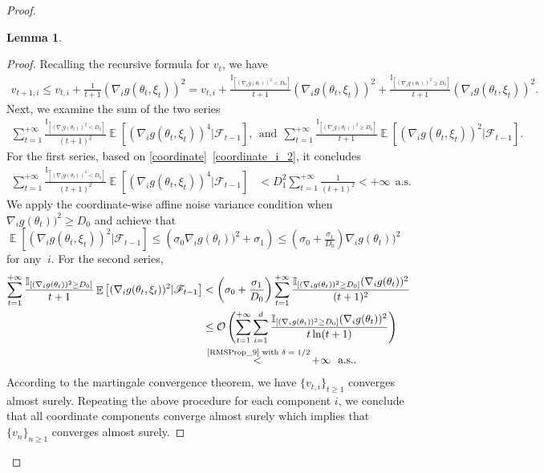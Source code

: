 \documentclass[standalone]{article}
\newcommand{\I}{\mathbb{I}}
\newtheorem{lem}{Lemma}[section]
\DeclareMathOperator{\Expect}{\mathbb{E}}
\begin{document}
\begin{proof}
\begin{lem}
\end{lem}
\begin{proof}
Recalling the recursive formula for \(v_t\), we have
\begin{align*}
   v_{t+1,i}\le v_{t,i}+\frac{1}{t+1}(\nabla_{i}g(\theta_{t},\xi_{t}))^{2} = v_{t,i}+\frac{\I_{[(\nabla_{i}g(\theta_{t}))^{2}<D_{0}]}}{t+1}(\nabla_{i}g(\theta_{t},\xi_{t}))^{2} +\frac{\I_{[(\nabla_{i}g(\theta_{t}))^{2}\ge D_{0}]}}{t+1}(\nabla_{i}g(\theta_{t},\xi_{t}))^{2}.
\end{align*}
Next, we examine the sum of the two series
\begin{align*}
 \sum_{t=1}^{+\infty}  \frac{\I_{[(\nabla_{i}g(\theta_{t}))^{2}<D_{0}]}}{(t+1)^{2}}\Expect\left[(\nabla_{i}g(\theta_{t},\xi_{t}))^{4} |\mathscr{F}_{t-1}\right],\ \ \text{and}\ \  \sum_{t=1}^{+\infty}  \frac{\I_{[(\nabla_{i}g(\theta_{t}))^{2}\ge D_{0}]}}{t+1}\Expect\left[(\nabla_{i}g(\theta_{t},\xi_{t}))^{2}|\mathscr{F}_{t-1}\right] .
\end{align*}
For the first series, based on \cref{coordinate}~\ref{coordinate_i_2}, it concludes
\begin{align*}
 \sum_{t=1}^{+\infty}  \frac{\I_{[(\nabla_{i}g(\theta_{t}))^{2}<D_{0}]}}{(t+1)^{2}}\Expect\left[(\nabla_{i}g(\theta_{t},\xi_{t}))^{4} |\mathscr{F}_{t-1}\right]&<D_{1}^{2}  \sum_{t=1}^{+\infty}  \frac{1}{(t+1)^{2}}<+\infty\ \ \text{a.s.}
\end{align*}
We apply the coordinate-wise affine noise variance condition when $\nabla_{i}g(\theta_{t}))^{2}\ge D_{0}$  and achieve that $\Expect\left[(\nabla_{i}g(\theta_{t},\xi_{t}))^{2} |\mathscr{F}_{t-1}\right] \leq \left(\sigma_0 \nabla_{i}g(\theta_{t}))^{2}  + \sigma_1 \right) \leq (\sigma_{0}+\frac{\sigma_{1}}{D_{0}})\nabla_{i}g(\theta_{t}))^{2}$ for any $\ i$. For the second series, 
\begin{align*}
 \sum_{t=1}^{+\infty}  \frac{\I_{[(\nabla_{i}g(\theta_{t}))^{2}\ge D_{0}]}}{t+1}\Expect\left[(\nabla_{i}g(\theta_{t},\xi_{t}))^{2} |\mathscr{F}_{t-1}\right]&<\left(\sigma_{0}+\frac{\sigma_{1}}{D_{0}}\right)  \sum_{t=1}^{+\infty}  \frac{\I_{[(\nabla_{i}g(\theta_{t}))^{2}\ge D_{0}]}(\nabla_{i}g(\theta_{t}))^{2}}{(t+1)^{2}}\\& \leq \mathcal{O}\left(\sum_{t=1}^{+\infty}  \sum_{i=1}^{d}\frac{\I_{[(\nabla_{i}g(\theta_{t}))^{2}\ge D_{0}]}(\nabla_{i}g(\theta_{t}))^{2}}{t\ln(t+1)}\right)\\&\mathop{<}^{\text{ \cref{RMSProp_9} with $\delta=1/2$}}+\infty \ \ \text{a.s.}.
\end{align*}
According to the martingale convergence theorem, we have \(\{v_{t,i}\}_{t \geq 1}\) converges almost surely. Repeating the above procedure for each component \(i\), we conclude that all coordinate components converge almost surely which implies that \(\{v_{n}\}_{n \geq 1}\) converges almost surely. 

\end{proof}
\end{proof}
\end{document}
